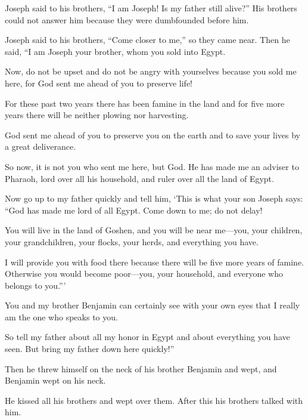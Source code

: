 \begin{scripture}
 Joseph said to his brothers, ``I am Joseph! Is my father still alive?'' His brothers could not answer him because they were dumbfounded before him.
 Joseph said to his brothers, ``Come closer to me,'' so they came near. Then he said, ``I am Joseph your brother, whom you sold into Egypt.
 Now, do not be upset and do not be angry with yourselves because you sold me here, for God sent me ahead of you to preserve life!
 For these past two years there has been famine in the land and for five more years there will be neither plowing nor harvesting.
 God sent me ahead of you to preserve you on the earth and to save your lives by a great deliverance.
 So now, it is not you who sent me here, but God. He has made me an adviser to Pharaoh, lord over all his household, and ruler over all the land of Egypt.
 Now go up to my father quickly and tell him, `This is what your son Joseph says: ``God has made me lord of all Egypt. Come down to me; do not delay!
 You will live in the land of Goshen, and you will be near me---you, your children, your grandchildren, your flocks, your herds, and everything you have.
 I will provide you with food there because there will be five more years of famine. Otherwise you would become poor---you, your household, and everyone who belongs to you.'''
 You and my brother Benjamin can certainly see with your own eyes that I really am the one who speaks to you.
 So tell my father about all my honor in Egypt and about everything you have seen. But bring my father down here quickly!''
\everypar{}

 Then he threw himself on the neck of his brother Benjamin and wept, and Benjamin wept on his neck.
 He kissed all his brothers and wept over them. After this his brothers talked with him.
\everypar{}


\end{scripture}
